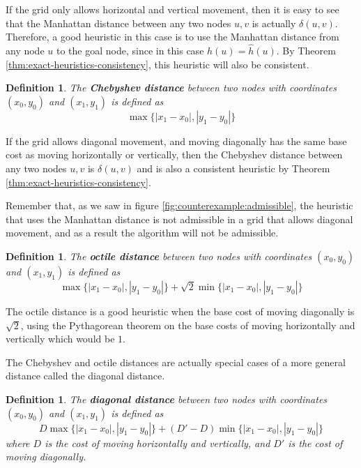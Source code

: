\documentclass[a4paper,10pt]{report}
\newtheorem{definition}[theorem]{Definition}
\begin{document}
If the grid only allows horizontal and vertical movement, then it is easy to see that the Manhattan distance between any two nodes $u, v$ is actually $\delta(u, v)$. Therefore, a good heuristic in this case is to use the Manhattan distance from any node $u$ to the goal node, since in this case $h(u) = \hat{h}(u)$. By Theorem \ref{thm:exact-heuristics-consistency}, this heuristic will also be consistent.

\begin{definition}
The \textbf{Chebyshev distance} between two nodes with coordinates $(x_0, y_0)$ and $(x_1, y_1)$ is defined as
\begin{equation}
\max \{ |x_1 - x_0|, |y_1 - y_0| \}\label{eq:chebyshev}
\end{equation}
\end{definition}

If the grid allows diagonal movement, and moving diagonally has the same base cost as moving horizontally or vertically, then the Chebyshev distance between any two nodes $u, v$ is $\delta(u, v)$ and is also a consistent heuristic by Theorem \ref{thm:exact-heuristics-consistency}.

Remember that, as we saw in figure \ref{fig:counterexample:admissible}, the heuristic that uses the Manhattan distance is not admissible in a grid that allows diagonal movement, and as a result the algorithm will not be admissible.

\begin{definition}
The \textbf{octile distance} between two nodes with coordinates $(x_0, y_0)$ and $(x_1, y_1)$ is defined as
\begin{equation}
\max \{ |x_1 - x_0|, |y_1 - y_0| \} + \sqrt{2} \min \{ |x_1 - x_0|, |y_1 - y_0| \}\label{eq:octile}
\end{equation}
\end{definition}

The octile distance is a good heuristic when the base cost of moving diagonally is $\sqrt{2}$, using the Pythagorean theorem on the base costs of moving horizontally and vertically which would be $1$.

The Chebyshev and octile distances are actually special cases of a more general distance called the diagonal distance.

\begin{definition}
The \textbf{diagonal distance} between two nodes with coordinates $(x_0, y_0)$ and $(x_1, y_1)$ is defined as
\begin{equation}
D \max \{ |x_1 - x_0|, |y_1 - y_0| \} + (D' - D) \min \{ |x_1 - x_0|, |y_1 - y_0| \}\label{eq:diagonal-distance}
\end{equation}
where $D$ is the cost of moving horizontally and vertically, and $D'$ is the cost of moving diagonally.
\end{definition}
\end{document}
